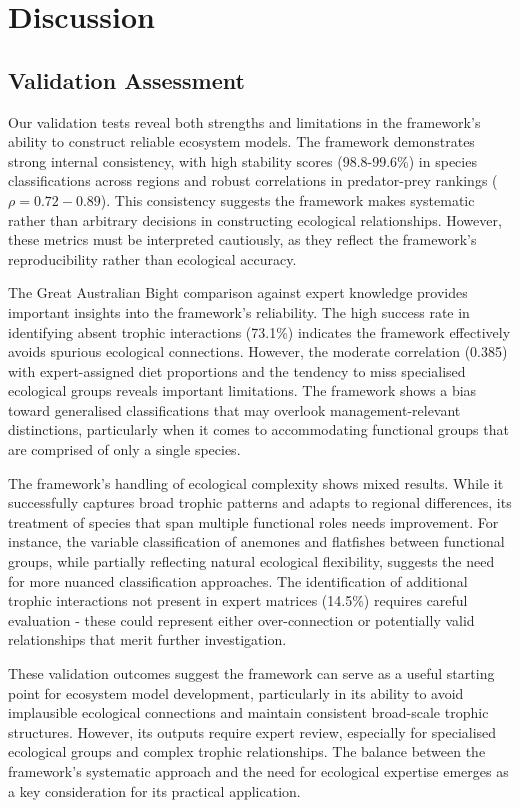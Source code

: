 \section{Discussion}

\subsection{Validation Assessment}

Our validation tests reveal both strengths and limitations in the framework's ability to construct reliable ecosystem models. The framework demonstrates strong internal consistency, with high stability scores (98.8-99.6\%) in species classifications across regions and robust correlations in predator-prey rankings ($\rho = 0.72-0.89$). This consistency suggests the framework makes systematic rather than arbitrary decisions in constructing ecological relationships. However, these metrics must be interpreted cautiously, as they reflect the framework's reproducibility rather than ecological accuracy.

The Great Australian Bight comparison against expert knowledge provides important insights into the framework's reliability. The high success rate in identifying absent trophic interactions (73.1\%) indicates the framework effectively avoids spurious ecological connections. However, the moderate correlation (0.385) with expert-assigned diet proportions and the tendency to miss specialised ecological groups reveals important limitations. The framework shows a bias toward generalised classifications that may overlook management-relevant distinctions, particularly when it comes to accommodating functional groups that are comprised of only a single species. 

The framework's handling of ecological complexity shows mixed results. While it successfully captures broad trophic patterns and adapts to regional differences, its treatment of species that span multiple functional roles needs improvement. For instance, the variable classification of anemones and flatfishes between functional groups, while partially reflecting natural ecological flexibility, suggests the need for more nuanced classification approaches. The identification of additional trophic interactions not present in expert matrices (14.5\%) requires careful evaluation - these could represent either over-connection or potentially valid relationships that merit further investigation.

These validation outcomes suggest the framework can serve as a useful starting point for ecosystem model development, particularly in its ability to avoid implausible ecological connections and maintain consistent broad-scale trophic structures. However, its outputs require expert review, especially for specialised ecological groups and complex trophic relationships. The balance between the framework's systematic approach and the need for ecological expertise emerges as a key consideration for its practical application.

